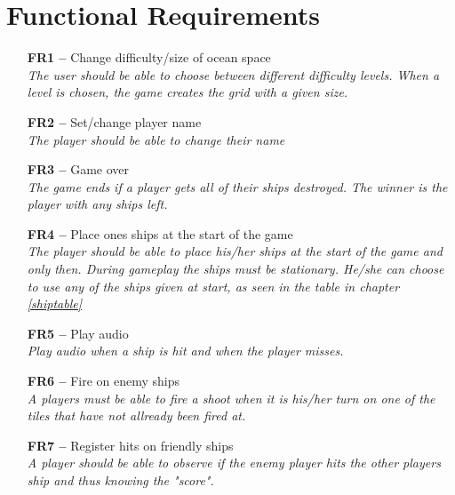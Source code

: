 \chapter{Functional Requirements}

\begin{itemize}
    \item[\textbf{FR1 --}] Change difficulty/size of ocean space \\
    \textit{\small{The user should be able to choose between different difficulty levels. When a level is chosen, the game creates the grid with a given size.}}
    \item[\textbf{FR2 --}] Set/change player name \\
    \textit{\small{The player should be able to change their name}}
    \item[\textbf{FR3 --}] Game over \\
    \textit{\small{The game ends if a player gets all of their ships destroyed. The winner is the player with any ships left.}}
    \item[\textbf{FR4 --}] Place ones ships at the start of the game \\
    \textit{\small{The player should be able to place his/her ships at the start of the game and only then. During gameplay the ships must be stationary. He/she can choose to use any of the ships given at start, as seen in the table in chapter \ref{shiptable}}}
    \item[\textbf{FR5 --}] Play audio \\
    \textit{\small{Play audio when a ship is hit and when the player misses.}}
    \item[\textbf{FR6 --}] Fire on enemy ships \\
    \textit{\small{A players must be able to fire a shoot when it is his/her turn on one of the tiles that have not allready been fired at.}}
    \item[\textbf{FR7 --}] Register hits on friendly ships \\
    \textit{\small{A player should be able to observe if the enemy player hits the other players ship and thus knowing the "score".}}
\end{itemize}